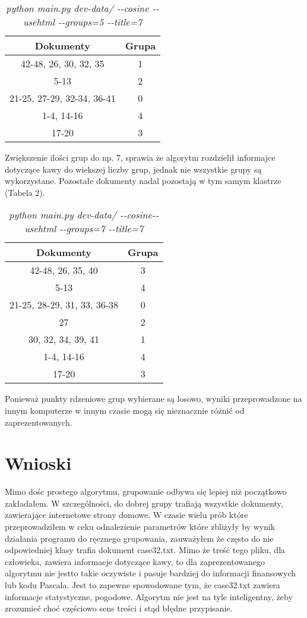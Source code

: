 \documentclass{article}
\begin{document}
\begin{table}[h]
\begin{center}
\begin{tabular}{ | c | c | }
\hline
Dokumenty & Grupa \\ \hline
42-48, 26, 30, 32, 35 & 1 \\ \hline
5-13 & 2 \\ \hline
21-25, 27-29, 32-34, 36-41 & 0 \\ \hline
1-4, 14-16 & 4 \\ \hline
17-20 & 3 \\ \hline
\end{tabular}
\end{center}
\caption{\emph{python main.py dev-data/ -{}-cosine -{}-usehtml -{}-groups=5  -{}-title=7}}
\end{table}

Zwiększenie ilości grup do np. 7, sprawia że algorytm rozdzielił informajce dotyczące kawy do wiekszej liczby grup, jednak nie wszystkie grupy są wykorzystane. Pozostałe dokumenty nadal pozostają w tym samym klastrze (Tabela 2).

\begin{table}[h]
\begin{center}
\begin{tabular}{ | c | c | }
\hline
Dokumenty & Grupa \\ \hline
42-48, 26, 35, 40 & 3 \\ \hline
5-13 & 4 \\ \hline
21-25, 28-29, 31, 33, 36-38 & 0 \\ \hline
27 & 2 \\ \hline
30, 32, 34, 39, 41 & 1 \\ \hline
1-4, 14-16 & 4 \\ \hline
17-20 & 3 \\ \hline
\end{tabular}
\caption{\emph{python main.py dev-data/ -{}-cosine-{}-usehtml -{}-groups=7 -{}-title=7}}
\end{center}
\end{table}

Ponieważ punkty rdzeniowe grup wybierane są losowo, wyniki przeprowadzone na innym komputerze w innym czasie mogą się nieznacznie różnić od zaprezentowanych.

\section{Wnioski}
Mimo dośc prostego algorytmu, grupowanie odbywa się lepiej niż początkowo zakładałem. W szczególności, do dobrej grupy trafiają wszystkie dokumenty, zawierające internetowe strony domowe. W czasie wielu prób które przeprowadziłem w ceku odnalezienie parametrów które zbliżyły by wynik działania programu do ręcznego grupowania, zauważyłem że często do nie odpowiedniej klasy trafia dokument case32.txt. Mimo że treść tego pliku, dla człowieka, zawiera informacje dotyczące kawy, to dla zaprezentowanego algorytmu nie jestto takie oczywiste i pasuje bardziej do informacji finansowych lub kodu Pascala. Jest to zapewne spowodowane tym, że case32.txt zawiera informacje statystyczne, pogodowe. Algorytm nie jest na tyle inteligentny, żeby zrozumieć choć częściowo sens treści i stąd błędne przypisanie.
\end{document}
